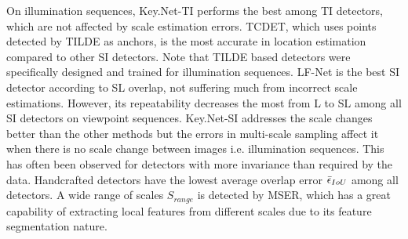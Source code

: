 On illumination sequences, Key.Net-TI performs the best among TI detectors, which are not affected by scale estimation errors. TCDET, which uses points detected by TILDE as anchors, is the most accurate in location estimation compared to other SI detectors. Note that TILDE based detectors were specifically designed and trained for illumination sequences. LF-Net is the best SI detector according to SL overlap, not suffering much from incorrect scale estimations. However, its repeatability decreases the most from L to SL among all SI detectors on viewpoint sequences. Key.Net-SI addresses the scale changes better than the other methods but the errors in multi-scale sampling affect it when there is no scale change between images i.e. illumination sequences. This has often been observed for detectors with more invariance than required by the data. Handcrafted detectors have the lowest average overlap error $\Bar{\epsilon}_{IoU}$ among all detectors. A wide range of scales $S_{range}$ is detected by MSER, which has a great capability of extracting local features from different scales due to its feature segmentation nature. 

